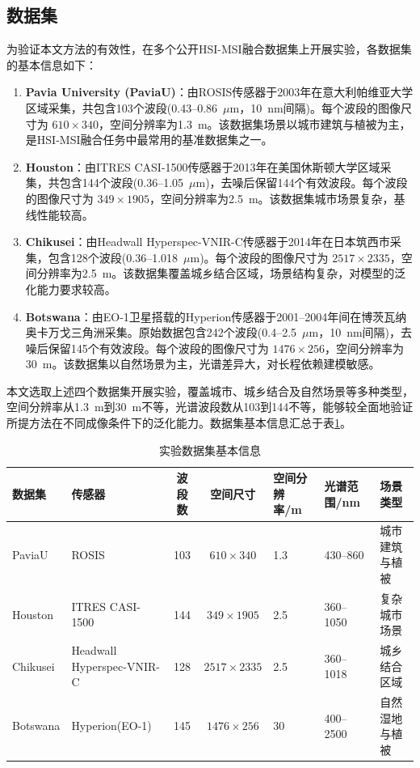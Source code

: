 \documentclass[UTF8,a4paper,11pt]{ctexart}
\begin{document}
\subsection{数据集}
为验证本文方法的有效性，在多个公开HSI-MSI融合数据集上开展实验，各数据集的基本信息如下：

\begin{enumerate}[label=\arabic*),leftmargin=2.2\ccwd,itemsep=2pt,topsep=2pt]
  \item \textbf{Pavia University (PaviaU)}：由ROSIS传感器于2003年在意大利帕维亚大学区域采集，共包含103个波段(0.43--0.86~$\mu$m，10~nm间隔)。每个波段的图像尺寸为 $610 \times 340$，空间分辨率为1.3~m。该数据集场景以城市建筑与植被为主，是HSI-MSI融合任务中最常用的基准数据集之一。
  \item \textbf{Houston}：由ITRES CASI-1500传感器于2013年在美国休斯顿大学区域采集，共包含144个波段(0.36--1.05~$\mu$m)，去噪后保留144个有效波段。每个波段的图像尺寸为 $349 \times 1905$，空间分辨率为2.5~m。该数据集城市场景复杂，基线性能较高。
  \item \textbf{Chikusei}：由Headwall Hyperspec-VNIR-C传感器于2014年在日本筑西市采集，包含128个波段(0.36--1.018~$\mu$m)。每个波段的图像尺寸为 $2517 \times 2335$，空间分辨率为2.5~m。该数据集覆盖城乡结合区域，场景结构复杂，对模型的泛化能力要求较高。
  \item \textbf{Botswana}：由EO-1卫星搭载的Hyperion传感器于2001--2004年间在博茨瓦纳奥卡万戈三角洲采集。原始数据包含242个波段(0.4--2.5~$\mu$m，10~nm间隔)，去噪后保留145个有效波段。每个波段的图像尺寸为 $1476 \times 256$，空间分辨率为30~m。该数据集以自然场景为主，光谱差异大，对长程依赖建模敏感。
\end{enumerate}

本文选取上述四个数据集开展实验，覆盖城市、城乡结合及自然场景等多种类型，空间分辨率从1.3~m到30~m不等，光谱波段数从103到144不等，能够较全面地验证所提方法在不同成像条件下的泛化能力。数据集基本信息汇总于表\ref{tab:datasets}。

\begin{table}[!htbp]
\centering\footnotesize
\caption{实验数据集基本信息}
\label{tab:datasets}
\setlength{\tabcolsep}{4pt}
\begin{tabular}{@{}llcclll@{}}
\toprule
数据集 & 传感器 & 波段数 & 空间尺寸 & 空间分辨率/m & 光谱范围/nm & 场景类型 \\
\midrule
PaviaU   & ROSIS                     & 103 & $610 \times 340$   & 1.3  & 430--860  & 城市建筑与植被 \\
Houston  & ITRES CASI-1500           & 144 & $349 \times 1905$  & 2.5  & 360--1050 & 复杂城市场景 \\
Chikusei & Headwall Hyperspec-VNIR-C & 128 & $2517 \times 2335$ & 2.5  & 360--1018 & 城乡结合区域 \\
Botswana & Hyperion(EO-1)            & 145 & $1476 \times 256$  & 30   & 400--2500 & 自然湿地与植被 \\
\bottomrule
\end{tabular}
\end{table}
\end{document}
